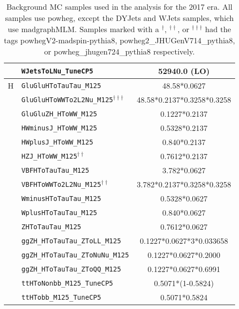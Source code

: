 \begin{table}[ht]
\begin{center}
{\begin{tabular}{|c|l|c|}
    & \texttt{WJetsToLNu\_TuneCP5} & 52940.0 (LO)\\
    \hline
    H & \texttt{GluGluHToTauTau\_M125} & 48.58*0.0627\\
    & \texttt{GluGluHToWWTo2L2Nu\_M125}$^{\dagger\dagger\dagger}$ & 48.58*0.2137*0.3258*0.3258\\
    & \texttt{GluGluZH\_HToWW\_M125} & 0.1227*0.2137\\
    & \texttt{HWminusJ\_HToWW\_M125} & 0.5328*0.2137\\
    & \texttt{HWplusJ\_HToWW\_M125} & 0.840*0.2137\\
    & \texttt{HZJ\_HToWW\_M125}$^{\dagger\dagger}$ & 0.7612*0.2137\\
    & \texttt{VBFHToTauTau\_M125} & 3.782*0.0627\\
    & \texttt{VBFHToWWTo2L2Nu\_M125}$^{\dagger\dagger}$ & 3.782*0.2137*0.3258*0.3258\\
    & \texttt{WminusHToTauTau\_M125} & 0.5328*0.0627\\
    & \texttt{WplusHToTauTau\_M125} & 0.840*0.0627\\
    & \texttt{ZHToTauTau\_M125} & 0.7612*0.0627\\
    & \texttt{ggZH\_HToTauTau\_ZToLL\_M125} & 0.1227*0.0627*3*0.033658\\
    & \texttt{ggZH\_HToTauTau\_ZToNuNu\_M125} & 0.1227*0.0627*0.2000\\
    & \texttt{ggZH\_HToTauTau\_ZToQQ\_M125} & 0.1227*0.0627*0.6991\\
    & \texttt{ttHToNonbb\_M125\_TuneCP5} & 0.5071*(1-0.5824)\\
    & \texttt{ttHTobb\_M125\_TuneCP5} & 0.5071*0.5824\\
    \hline
    \end{tabular}
    }
    \end{center}
    \caption{Background MC samples used in the analysis for the 2017 era. All samples use powheg, except the DYJets and WJets samples, which use madgraphMLM. Samples marked with a $^\dagger$, $^{\dagger\dagger}$, or $^{\dagger\dagger\dagger}$ had the tags powhegV2-madspin-pythia8, powheg2\_JHUGenV714\_pythia8, or powheg\_jhugen724\_pythia8 respectively.}
    \label{tab:2017mcbkg}
    \end{table}
    
